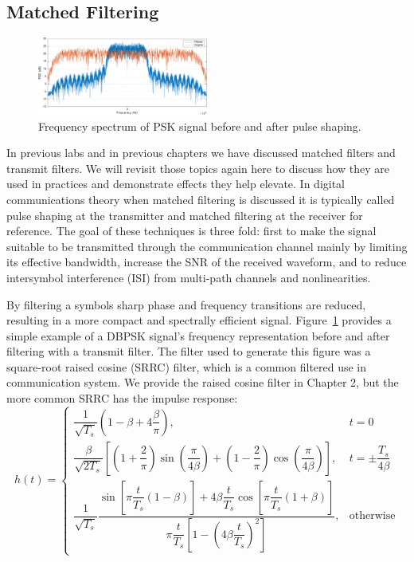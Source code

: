 \documentclass[letterpaper,12pt]{article}
\begin{document}
\subsection{Matched Filtering}\label{sec:models}
%
\begin{figure}[!ht]
 \centering
 \includegraphics[width=0.5\textwidth]{bandlimiting-eps-converted-to-crop.pdf}
\caption{Frequency spectrum of PSK signal before and after pulse shaping.}
\label{fig:bandlimiting}
\end{figure} 
%
In previous labs and in previous chapters we have discussed matched filters and transmit filters.  We will 
revisit those topics again here to discuss how they are used in practices and demonstrate effects they help 
elevate.  In digital communications theory when matched filtering is discussed it is typically called pulse 
shaping at the transmitter and matched filtering at the receiver for reference.   The goal of these 
techniques is three fold: first to make the signal suitable to be transmitted through the communication channel mainly by limiting its effective bandwidth, increase the SNR of the received waveform, and to reduce intersymbol interference (ISI) from multi-path channels and nonlinearities.\par
%
By filtering a symbols sharp phase and frequency transitions are reduced, resulting in a more compact and 
spectrally efficient signal. Figure~\ref{fig:bandlimiting} provides a simple example of a DBPSK signal's frequency representation before and after filtering with a transmit filter.  The filter used to generate this figure was a square-root raised cosine (SRRC) filter, which is a common filtered use in communication system. We provide the  raised cosine filter in Chapter 2, but the more common SRRC has the impulse response:
%
\begin{equation}
	h(t) = \begin{cases}
 \dfrac{1}{\sqrt{T_s}} \left( 1-\beta+4\dfrac{\beta}{\pi} \right),
       & t = 0 \\

\dfrac{\beta}{\sqrt{2T_s}}
\left[
\left(1+\dfrac{2}{\pi}\right)\sin\left(\dfrac{\pi}{4\beta}\right) +
\left(1-\dfrac{2}{\pi}\right)\cos\left(\dfrac{\pi}{4\beta}\right)
\right],
       & t = \pm \dfrac{T_s}{4\beta} \\

\dfrac{1}{\sqrt{T_s}} \dfrac{\sin\left[\pi \dfrac{t}{T_s}\left(1-\beta\right)\right] + 4\beta\dfrac{t}{T_s}\cos\left[\pi\dfrac{t}{T_s}\left(1+\beta\right)\right]}{\pi \dfrac{t}{T_s}\left[1-\left(4\beta\dfrac{t}{T_s} \right)^2 \right]},
       & \mbox{otherwise}
\end{cases}
\end{equation}
\end{document}
